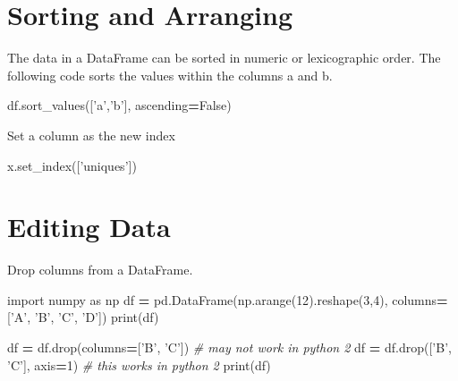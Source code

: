 \documentclass[]{book}
\newenvironment{Shaded}{\begin{snugshade}}{\end{snugshade}}
\newcommand{\BuiltInTok}[1]{#1}
\newcommand{\CommentTok}[1]{\textcolor[rgb]{0.56,0.35,0.01}{\textit{#1}}}
\newcommand{\DecValTok}[1]{\textcolor[rgb]{0.00,0.00,0.81}{#1}}
\newcommand{\ImportTok}[1]{#1}
\newcommand{\NormalTok}[1]{#1}
\newcommand{\OperatorTok}[1]{\textcolor[rgb]{0.81,0.36,0.00}{\textbf{#1}}}
\newcommand{\StringTok}[1]{\textcolor[rgb]{0.31,0.60,0.02}{#1}}
\newcommand{\VariableTok}[1]{\textcolor[rgb]{0.00,0.00,0.00}{#1}}
\begin{document}
\hypertarget{sorting-and-arranging}{%
\section{Sorting and Arranging}\label{sorting-and-arranging}}

The data in a DataFrame can be sorted in numeric or lexicographic order.
The following code sorts the values within the columns a and b.

\begin{Shaded}
\begin{Highlighting}[]
\NormalTok{df.sort_values([}\StringTok{'a'}\NormalTok{,}\StringTok{'b'}\NormalTok{], ascending}\OperatorTok{=}\VariableTok{False}\NormalTok{)}
\end{Highlighting}
\end{Shaded}

Set a column as the new index

\begin{Shaded}
\begin{Highlighting}[]
\NormalTok{x.set_index([}\StringTok{'uniques'}\NormalTok{])}
\end{Highlighting}
\end{Shaded}

\hypertarget{editing-data}{%
\section{Editing Data}\label{editing-data}}

Drop columns from a DataFrame.

\begin{Shaded}
\begin{Highlighting}[]
\ImportTok{import}\NormalTok{ numpy }\ImportTok{as}\NormalTok{ np}
\NormalTok{df }\OperatorTok{=}\NormalTok{ pd.DataFrame(np.arange(}\DecValTok{12}\NormalTok{).reshape(}\DecValTok{3}\NormalTok{,}\DecValTok{4}\NormalTok{),}
\NormalTok{                    columns}\OperatorTok{=}\NormalTok{[}\StringTok{'A'}\NormalTok{, }\StringTok{'B'}\NormalTok{, }\StringTok{'C'}\NormalTok{, }\StringTok{'D'}\NormalTok{])}
\BuiltInTok{print}\NormalTok{(df)}

\NormalTok{df }\OperatorTok{=}\NormalTok{ df.drop(columns}\OperatorTok{=}\NormalTok{[}\StringTok{'B'}\NormalTok{, }\StringTok{'C'}\NormalTok{]) }\CommentTok{# may not work in python 2}
\NormalTok{df }\OperatorTok{=}\NormalTok{ df.drop([}\StringTok{'B'}\NormalTok{, }\StringTok{'C'}\NormalTok{], axis}\OperatorTok{=}\DecValTok{1}\NormalTok{) }\CommentTok{# this works in python 2}
\BuiltInTok{print}\NormalTok{(df)}
\end{Highlighting}
\end{Shaded}
\end{document}
